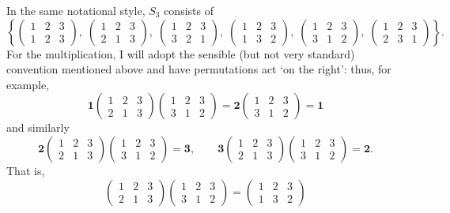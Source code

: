 In the same notational style, $S_3$ consists of
\[
  \left\{
    \begin{pmatrix}1&2&3\\1&2&3\end{pmatrix},\;
    \begin{pmatrix}1&2&3\\2&1&3\end{pmatrix},\;
    \begin{pmatrix}1&2&3\\3&2&1\end{pmatrix},\;
    \begin{pmatrix}1&2&3\\1&3&2\end{pmatrix},\;
    \begin{pmatrix}1&2&3\\3&1&2\end{pmatrix},\;
    \begin{pmatrix}1&2&3\\2&3&1\end{pmatrix} \right\}.
\]
For the multiplication, I will adopt the sensible (but not very
standard) convention mentioned above and have permutations act `on the
right': thus, for example,
\[
  \mathbf{1}
  \begin{pmatrix}1&2&3\\2&1&3\end{pmatrix}
  \begin{pmatrix}1&2&3\\3&1&2\end{pmatrix} =
  \mathbf{2}\begin{pmatrix}1&2&3\\3&1&2\end{pmatrix} = \mathbf{1}
\]
and similarly
\[
  \mathbf{2}
  \begin{pmatrix}1&2&3\\2&1&3\end{pmatrix}
  \begin{pmatrix}1&2&3\\3&1&2\end{pmatrix} = \mathbf{3}, \qquad
  \mathbf{3}
  \begin{pmatrix}1&2&3\\2&1&3\end{pmatrix}
  \begin{pmatrix}1&2&3\\3&1&2\end{pmatrix} = \mathbf{2}.
\]
That is,
\[
  \begin{pmatrix}1&2&3\\2&1&3\end{pmatrix}
  \begin{pmatrix}1&2&3\\3&1&2\end{pmatrix}
  = \begin{pmatrix}1&2&3\\1&3&2\end{pmatrix}
\]
